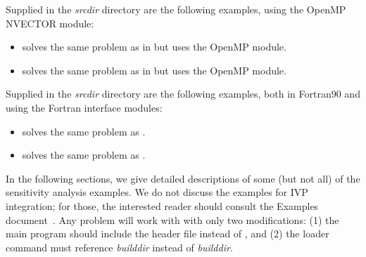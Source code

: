
\vspace{0.2in}\noindent 
Supplied in the {\em srcdir} directory are
the following examples, using the OpenMP NVECTOR module:

\begin{itemize}

\item {} solves the same problem as in
 but uses the OpenMP module. 

\item {} solves the same problem as in
 but uses the OpenMP module. 

\end{itemize}


\vspace{0.2in}\noindent Supplied in the
{\em srcdir} directory are the
following examples, both in Fortran90 and using the {\sundials} Fortran
interface modules:

\begin{itemize}

\item {} solves the same problem as .

\item {} solves the same problem as
  .

\end{itemize}


\vspace{0.2in}\noindent
In the following sections, we give detailed descriptions of some (but
not all) of the sensitivity analysis examples. We do not discuss the 
examples for IVP integration; for those, the interested reader should consult
the {\ida} Examples document~\cite{ida_ex}. Any {\ida} problem
will work with {\idas} with only two modifications: (1) the main program
should include the header file  instead of , and
(2) the loader command must reference
{\em builddir} instead of
{\em builddir}.

